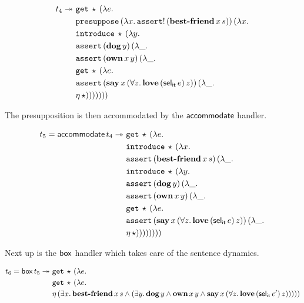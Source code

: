 \begin{align*}
  t_4 \tto\ 
  &\app{\op{get}}{\star}{(\lam{e}{ \\
  &\app{\op{presuppose}}{(\lam{x}{\ap{\op{assert}!}{(\app{\obj{best-friend}}{x}{s})}})}{(\lam{x}{ \\
  &\app{\op{introduce}}{\star}{(\lam{y}{ \\
  &\app{\op{assert}}{(\ap{\obj{dog}}{y})}{(\lam{\_}{ \\
  &\app{\op{assert}}{(\app{\obj{own}}{x}{y})}{(\lam{\_}{ \\
  &\app{\op{get}}{\star}{(\lam{e}{ \\
  &\app{\op{assert}}{(\app{\obj{say}}{x}{(\forall z.\, \app{\obj{love}}{(\ap{\selit}{e})}{z})})}{(\lam{\_}{ \\
  &\etaE{\star}})}})}})}})}})}})}})}
\end{align*}

The presupposition is then accommodated by the $\mathsf{accommodate}$ handler.

\begin{align*}
  t_5 = \ap{\accommodate}{t_4} \tto \ 
  &\app{\op{get}}{\star}{(\lam{e}{ \\
  &\app{\op{introduce}}{\star}{(\lam{x}{ \\
  &\app{\op{assert}}{(\app{\obj{best-friend}}{x}{s})}{(\lam{\_}{ \\
  &\app{\op{introduce}}{\star}{(\lam{y}{ \\
  &\app{\op{assert}}{(\ap{\obj{dog}}{y})}{(\lam{\_}{ \\
  &\app{\op{assert}}{(\app{\obj{own}}{x}{y})}{(\lam{\_}{ \\
  &\app{\op{get}}{\star}{(\lam{e}{ \\
  &\app{\op{assert}}{(\app{\obj{say}}{x}{(\forall z.\, \app{\obj{love}}{(\ap{\selit}{e})}{z})})}{(\lam{\_}{ \\
  &\etaE{\star}})}})}})}})}})}})}})}})}
\end{align*}

Next up is the $\mathsf{box}$ handler which takes care of the sentence dynamics.

\begin{align*}
  t_6 = \mathsf{box}\,t_5 \twoheadrightarrow \
  &\mathtt{get}\,\star\,(\lambda e.\,  \\
  &\mathtt{get}\,\star\,(\lambda e.\,  \\
  &\eta\,(\exists x.\, \textbf{best-friend}\,x\,s \land
          (\exists y.\, \textbf{dog}\,y \land \textbf{own}\,x\,y \land
           \textbf{say}\,x\,(\forall z.\, \textbf{love}\,(\mathsf{sel}_{\mathsf{it}}\,e')\,z)))))
\end{align*}

